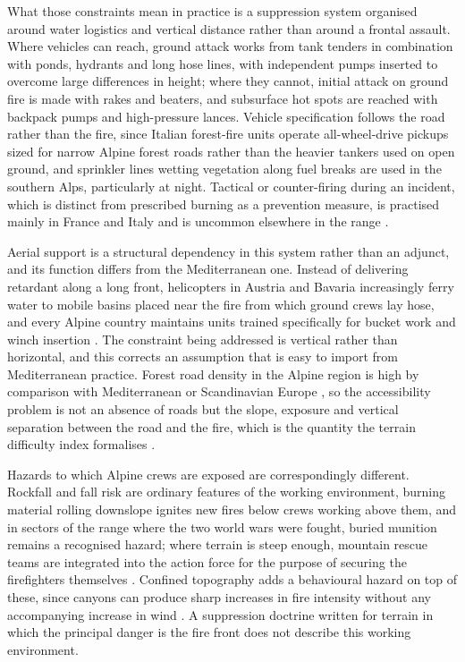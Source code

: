 \documentclass[11pt,a4paper]{article}
\begin{document}
What those constraints mean in practice is a suppression system organised around water logistics and vertical distance rather than around a frontal assault. Where vehicles can reach, ground attack works from tank tenders in combination with ponds, hydrants and long hose lines, with independent pumps inserted to overcome large differences in height; where they cannot, initial attack on ground fire is made with rakes and beaters, and subsurface hot spots are reached with backpack pumps and high-pressure lances. Vehicle specification follows the road rather than the fire, since Italian forest-fire units operate all-wheel-drive pickups sized for narrow Alpine forest roads rather than the heavier tankers used on open ground, and sprinkler lines wetting vegetation along fuel breaks are used in the southern Alps, particularly at night. Tactical or counter-firing during an incident, which is distinct from prescribed burning as a prevention measure, is practised mainly in France and Italy and is uncommon elsewhere in the range \citep{muller_forest_2020}.

Aerial support is a structural dependency in this system rather than an adjunct, and its function differs from the Mediterranean one. Instead of delivering retardant along a long front, helicopters in Austria and Bavaria increasingly ferry water to mobile basins placed near the fire from which ground crews lay hose, and every Alpine country maintains units trained specifically for bucket work and winch insertion \citep{muller_forest_2020}. The constraint being addressed is vertical rather than horizontal, and this corrects an assumption that is easy to import from Mediterranean practice. Forest road density in the Alpine region is high by comparison with Mediterranean or Scandinavian Europe \citep{muller_forest_2020}, so the accessibility problem is not an absence of roads but the slope, exposure and vertical separation between the road and the fire, which is the quantity the terrain difficulty index formalises \citep{cardil_assessing_2025}.

Hazards to which Alpine crews are exposed are correspondingly different. Rockfall and fall risk are ordinary features of the working environment, burning material rolling downslope ignites new fires below crews working above them, and in sectors of the range where the two world wars were fought, buried munition remains a recognised hazard; where terrain is steep enough, mountain rescue teams are integrated into the action force for the purpose of securing the firefighters themselves \citep{muller_forest_2020}. Confined topography adds a behavioural hazard on top of these, since canyons can produce sharp increases in fire intensity without any accompanying increase in wind \citep{muller_forest_2020, hayajneh_wind_2026}. A suppression doctrine written for terrain in which the principal danger is the fire front does not describe this working environment.
\end{document}
